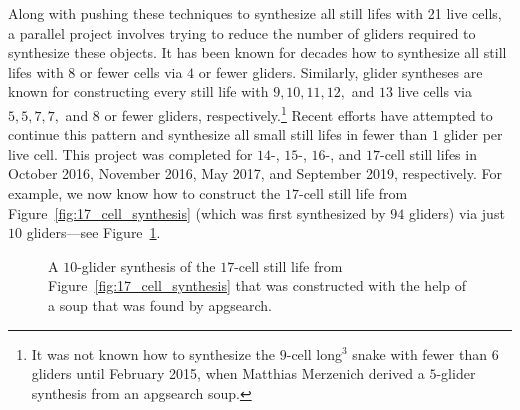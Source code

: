 Along with pushing these techniques to synthesize all still lifes with 21 live cells, a parallel project involves trying to reduce the number of gliders required to synthesize these objects. It has been known for decades how to synthesize all still lifes with $8$ or fewer cells via $4$ or fewer gliders. Similarly, glider syntheses are known for constructing every still life with $9, 10, 11, 12,$ and $13$ live cells via $5, 5, 7, 7,$ and $8$ or fewer gliders, respectively.\footnote{It was not known how to synthesize the $9$-cell long$^3$ snake with fewer than $6$ gliders until February 2015, when Matthias Merzenich derived a $5$-glider synthesis from an apgsearch soup.} Recent efforts have attempted to continue this pattern and synthesize all small still lifes in fewer than $1$ glider per live cell. This project was completed for $14$-, $15$-, $16$-, and $17$-cell still lifes in October 2016, November 2016, May 2017, and September 2019, respectively. For example, we now know how to construct the $17$-cell still life from Figure~\ref{fig:17_cell_synthesis} (which was first synthesized by $94$ gliders) via just $10$ gliders---see Figure~\ref{fig:17_cell_synthesis_small}.

\begin{figure}[!htb]
	\centering
	\caption{A $10$-glider synthesis of the $17$-cell still life from Figure~\ref{fig:17_cell_synthesis} that was constructed with the help of a soup that was found by apgsearch.}\label{fig:17_cell_synthesis_small}
\end{figure}

